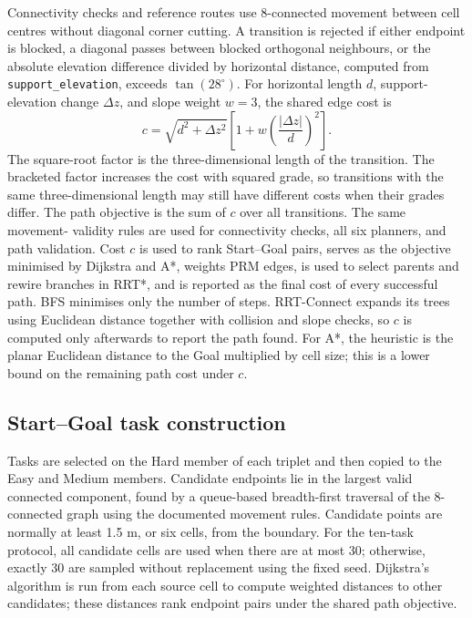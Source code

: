 \documentclass[11pt]{article}
\begin{document}
Connectivity checks and reference routes use 8-connected movement between cell
centres without diagonal corner cutting. A transition is rejected if either
endpoint is blocked, a diagonal passes between blocked orthogonal neighbours,
or the absolute elevation difference divided by horizontal distance, computed
from \texttt{support\_elevation}, exceeds $\tan(28^\circ)$. For horizontal
length $d$, support-elevation change $\Delta z$, and slope weight $w=3$, the
shared edge cost is
\begin{equation}
  c=\sqrt{d^2+\Delta z^2}
  \left[1+w\left(\frac{|\Delta z|}{d}\right)^2\right].
\end{equation}
The square-root factor is the three-dimensional length of the transition. The
bracketed factor increases the cost with squared grade, so transitions with
the same three-dimensional length may still have different costs when their
grades differ.
The path objective is the sum of $c$ over all transitions. The same movement-
validity rules are used for connectivity checks, all six planners, and path
validation. Cost $c$ is used to rank Start--Goal pairs, serves as the objective
minimised by Dijkstra and A*, weights PRM edges, is used to select parents and
rewire branches in RRT*, and is reported as the final cost of every successful
path. BFS minimises only the number of steps.
RRT-Connect expands its trees using Euclidean distance together with collision
and slope checks, so $c$ is computed only afterwards to report the path found.
For A*, the heuristic is the planar Euclidean distance to the Goal multiplied
by cell size; this is a lower bound on the remaining path cost under $c$.

\subsection{Start--Goal task construction}

Tasks are selected on the Hard member of each triplet and then copied to the
Easy and Medium members. Candidate endpoints lie in the largest valid connected
component, found by a queue-based breadth-first traversal of the 8-connected
graph using the documented movement rules. Candidate points are normally at
least 1.5 m, or six cells, from the boundary. For the ten-task protocol, all
candidate cells are used when there are at most 30; otherwise, exactly 30 are
sampled without replacement using the fixed seed. Dijkstra's
algorithm\cite{dijkstra} is run from each source cell
to compute weighted distances to other candidates; these distances rank
endpoint pairs under the shared path objective.
\end{document}
